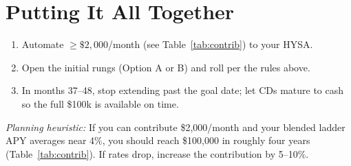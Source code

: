 \documentclass[11pt]{article}
\begin{document}
\section*{Putting It All Together}
\begin{enumerate}
  \item Automate $\geq\$2{,}000$/month (see Table~\ref{tab:contrib}) to your HYSA.
  \item Open the initial rungs (Option A or B) and roll per the rules above.
  \item In months 37--48, stop extending past the goal date; let CDs mature to cash so the full \$100k is available on time.
\end{enumerate}

\bigskip
\noindent\textit{Planning heuristic:} If you can contribute \$2{,}000/month and your blended ladder APY averages near 4\%, you should reach \$100{,}000 in roughly four years (Table~\ref{tab:contrib}). If rates drop, increase the contribution by 5--10\%.
\end{document}

